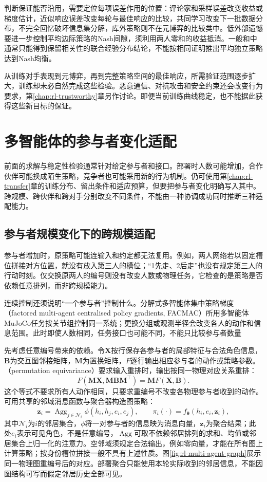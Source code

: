 判断保证能否沿用，需要定位每项误差作用的位置：评论家和采样误差改变收益或梯度估计，近似响应误差改变每轮与最佳响应的比较，共同学习改变下一批数据分布，不完全回忆破坏信息集分解，库外策略则不在元博弈的比较类中。低外部遗憾要进一步控制平均边际策略的Nash间隙，须利用两人零和的收益抵消。一般和中通常只能得到保留相关性的联合经验分布结论，不能按相同证明推出平均独立策略达到Nash均衡。

从训练对手表现到元博弈，再到完整策略空间的最佳响应，所需验证范围逐步扩大，训练却未必自然完成这些检验。恶意通信、对抗攻击和安全约束还会改变行为要求，第\ref{chap:rl-trustworthy}章另作讨论。即便当前训练曲线稳定，也不能据此获得这些新目标的保证。

\section{多智能体的参与者变化适配}
\label{sec:rl-multi-agent-adaptation}

前面的求解与稳定性检验通常针对给定参与者和接口。部署时人数可能增加，合作伙伴可能换成陌生策略，竞争者也可能采用新的行为机制。仍可使用第\ref{chap:rl-transfer}章的训练分布、留出条件和适应预算，但要把参与者变化明确写入其中。跨规模、跨伙伴和跨对手分别改变不同条件，不能由一种协调成功同时推断三种适配能力。

\subsection{参与者规模变化下的跨规模适配}
\label{sec:rl-multi-agent-scale}

参与者增加时，原策略可能连输入和约定都无法复用。例如，两人网络若以固定槽位拼接对方位置，就没有放入第三人的槽位；“1先走、2后走”也没有规定第三人的行动时刻。仅交换原两人的编号则没有改变人数或物理任务，它检查的是策略是否依赖任意排列，而非跨规模能力。

连续控制还须说明“一个参与者”控制什么。分解式多智能体集中策略梯度（factored multi-agent centralised policy gradients, FACMAC）所用多智能体MuJoCo任务按关节组控制同一系统；更换分组或观测半径会改变各人的动作和信息范围。此时即使人数相同，任务接口也可能不同，不能只比较参与者数量

先考虑任意编号带来的依赖。令$\bm X$按行保存各参与者的局部特征与合法角色信息，$\bm B$为交互图邻接矩阵，$\bm M$为置换矩阵，$F$逐行输出相应参与者的动作或策略参数。（permutation equivariance）要求输入重排时，输出按同一物理对应关系重排：
\[
 F(\bm M\bm X,\bm M\bm B\bm M^\top)=\bm M F(\bm X,\bm B).
\]
这个等式不要求所有人动作相同，只要求重编号不改变各物理参与者收到的动作。可用共享的邻域消息函数与聚合器构造图策略：
\[
 \bm z_i=\operatorname{Agg}_{j\in\mathcal N_i}
           \phi(h_i,h_j,e_i,e_j),\qquad
 \pi_i(\cdot)=f_{\bm\theta}(h_i,e_i,\bm z_i),
\]
其中$\mathcal N_i$为$i$的邻居集合，$\phi$将一对参与者的信息映为消息向量，$\bm z_i$为聚合结果；此处$e_i$表示可见角色，不是任意编号，$\operatorname{Agg}$可取不依赖邻居排列的求和、均值或邻居集合上归一化的注意力。空邻域须规定合法输出，例如零向量，才能在所有图上计算策略；按身份槽位拼接一般不具有上述性质。图\ref{fig:rl-multi-agent-graph}展示同一物理图重编号后的对应。部署聚合只能使用本轮实际收到的邻居信息，不能因图结构可写而假定邻居历史全部可见。

